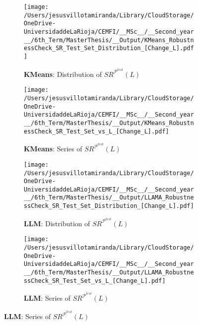\begin{figure}[H]
  \centering
  \caption{Sensitivity of $SR^{\mathcal P^{test}}$ to the holding window length ($L$)}
    \begin{subfigure}[b]{0.44\textwidth}
    \centering
    \texttt{[image: /Users/jesusvillotamiranda/Library/CloudStorage/OneDrive-UniversidaddeLaRioja/CEMFI/\_\_MSc\_\_/\_\_Second\_year\_\_/6th\_Term/MasterThesis/\_\_Output/KMeans\_RobustnessCheck\_SR\_Test\_Set\_Distribution\_[Change\_L].pdf]}
    \caption{\textbf{KMeans}: Distribution of $SR^{\mathcal P^{test}}(L)$}
    \label{fig:KMeans_Robustness_L_Distr}
  \end{subfigure}
  \hspace{0.05\textwidth} %
  \begin{subfigure}[b]{0.44\textwidth}
    \centering
    \texttt{[image: /Users/jesusvillotamiranda/Library/CloudStorage/OneDrive-UniversidaddeLaRioja/CEMFI/\_\_MSc\_\_/\_\_Second\_year\_\_/6th\_Term/MasterThesis/\_\_Output/KMeans\_RobustnessCheck\_SR\_Test\_Set\_vs\_L\_[Change\_L].pdf]}
    \caption{\textbf{KMeans}: Series of $SR^{\mathcal P^{test}}(L)$}
    \label{fig:KMeans_Robustness_L_Series}
  \end{subfigure}
  
  \bx 
      \begin{subfigure}[b]{0.44\textwidth}
    \centering
    \texttt{[image: /Users/jesusvillotamiranda/Library/CloudStorage/OneDrive-UniversidaddeLaRioja/CEMFI/\_\_MSc\_\_/\_\_Second\_year\_\_/6th\_Term/MasterThesis/\_\_Output/LLAMA\_RobustnessCheck\_SR\_Test\_Set\_Distribution\_[Change\_L].pdf]}
    \caption{\textbf{LLM}: Distribution of $SR^{\mathcal P^{test}}(L)$}
    \label{fig:LLM_Robustness_L_Distr}
  \end{subfigure}
  \hspace{0.05\textwidth} %
  \begin{subfigure}[b]{0.44\textwidth}
    \centering
    \texttt{[image: /Users/jesusvillotamiranda/Library/CloudStorage/OneDrive-UniversidaddeLaRioja/CEMFI/\_\_MSc\_\_/\_\_Second\_year\_\_/6th\_Term/MasterThesis/\_\_Output/LLAMA\_RobustnessCheck\_SR\_Test\_Set\_vs\_L\_[Change\_L].pdf]}
    \caption{\textbf{LLM}: Series of $SR^{\mathcal P^{test}}(L)$}
    \label{fig:LLM_Robustness_L_Series}
  \end{subfigure}

\label{fig:LLM_Robustness_L}
\end{figure}

